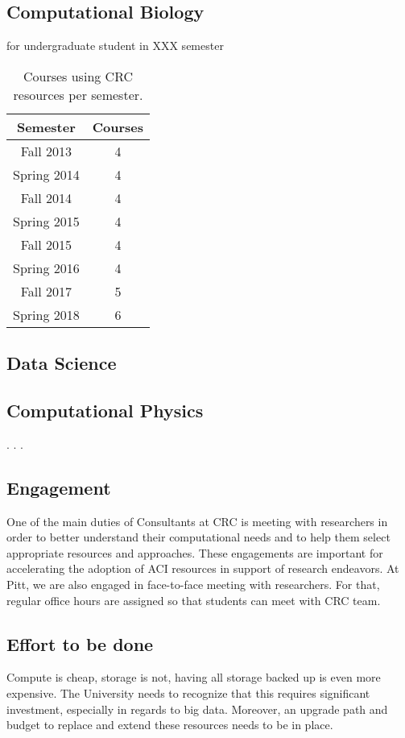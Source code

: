 \documentclass[conference]{IEEEtran}
\begin{document}
\subsection*{Computational Biology}
for undergraduate student in XXX semester



\begin{table}[]
\centering
    \begin{tabular}{c|c}

      Semester   & Courses \\
      \hline
        Fall 2013 & 4 \\
        Spring 2014 & 4 \\
        Fall 2014 & 4 \\
        Spring 2015 & 4 \\
        Fall 2015 & 4 \\
        Spring 2016 & 4 \\
        Fall 2017 & 5 \\
        Spring 2018 & 6 
    \end{tabular}
    \label{tab:my_label}
    \caption{Courses using CRC resources per semester.}
\end{table}

\subsection*{Data Science}

\subsection*{Computational Physics}
.
.
.


\subsection{Engagement}
One of the main duties of Consultants at CRC is meeting with	researchers	in order to better	understand their computational needs and to help them select appropriate resources and approaches. These engagements are important for accelerating the adoption of ACI resources in support of research endeavors. At Pitt, we are also engaged in face-to-face meeting with researchers. For that, regular office hours are assigned so that students can meet with CRC team.

\subsection{Effort to be done}
Compute is
cheap, storage is not, having all storage backed up is even more expensive. The University needs
to recognize that this requires significant investment, especially in regards to big data. Moreover,
an upgrade path and budget to replace and extend these resources needs to be in place.
\end{document}
